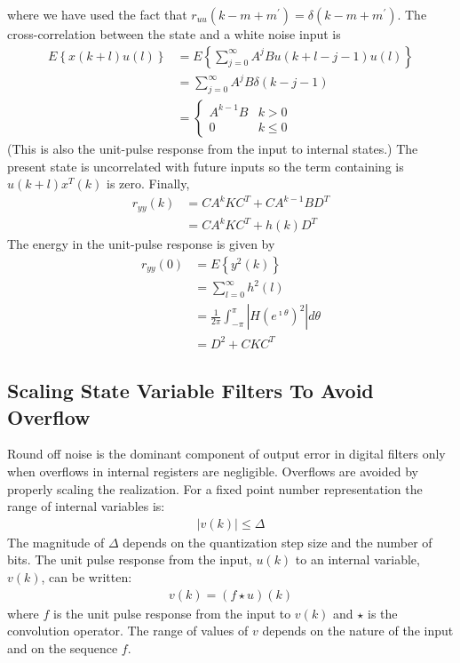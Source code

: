 \documentclass[a4paper,twoside,10pt,english]{report}
\begin{document}
where we have used the fact that 
$r_{uu}\left(k-m+m^{\prime}\right)=\delta\left(k-m+m^{\prime}\right)$.
The cross-correlation between the state and a white noise input is
\begin{align*}
E\left\{x\left(k+l\right)u\left(l\right)\right\} 
&= E\left\{\sum_{j=0}^{\infty}A^{j}Bu\left(k+l-j-1\right)u\left(l\right)\right\}\\
&= \sum_{j=0}^{\infty}A^{j}B\delta\left(k-j-1\right)\\
&= \begin{cases}
A^{k-1}B & k>0\\
0 & k\leq0
\end{cases}
\end{align*}
(This is also the unit-pulse response from the input to internal states.)
The present state is uncorrelated with future inputs so the term containing
is $u\left(k+l\right)x^{T}\left(k\right)$ is zero. Finally,
\begin{align*}
r_{yy}\left(k\right) 
&= CA^{k}KC^{T}+CA^{k-1}BD^{T}\\
&= CA^{k}KC^{T}+h\left(k\right)D^{T}
\end{align*}
The energy in the unit-pulse response is given by
\begin{align*}
r_{yy}\left(0\right) &= E\left\{y^{2}\left(k\right)\right\}\\
&= \sum_{l=0}^{\infty}h^{2}\left(l\right)\\
&= \frac{1}{2\pi}\int_{-\pi}^{\pi}\left|H\left(e^{\imath\theta}\right)^{2}
\right|d\theta\\
&= D^{2}+CKC^{T}
\end{align*}
\subsection{Scaling State Variable Filters To Avoid Overflow\label{sec:Scaling-State-Variable-Filters-To-Avoid-Overflow}}
Round off noise is the dominant component of output error
in digital filters only when overflows in internal registers are negligible.
Overflows are avoided by properly scaling the realization. For a fixed
point number representation the range of internal variables is:
\begin{align*}
\left|v\left(k\right)\right|\le\Delta
\end{align*}
The magnitude of $\Delta$ depends on the quantization
step size and the number of bits. The unit pulse response from the
input, $u\left(k\right)$ to an internal variable, $v\left(k\right)$, can be 
written:
\begin{align*}
v\left(k\right)=\left(f \star u\right)\left(k\right)
\end{align*}
where $f$ is the unit pulse response from the input to $v\left(k\right)$
and $\star$ is the convolution operator. The range of values of $v$ depends
on the nature of the input and on the sequence $f$.
\end{document}

